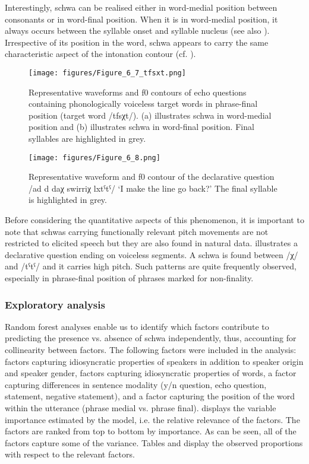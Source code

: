 Interestingly, schwa can be realised either in word-medial position between consonants or in word-final position. When it is in word-medial position, it always occurs between the syllable onset and syllable nucleus (see also \citealt{GordonNafi2012}). Irrespective of its position in the word, schwa appears to carry the same characteristic aspect of the intonation contour (cf. ).
   
  \begin{figure}
   \texttt{[image: figures/Figure\_6\_7\_tfsxt.png]}
  \caption{Representative waveforms and f0 contours of echo questions containing phonologically voiceless target words in phrase-final position (target word /tfsχt/). (a) illustrates schwa in word-medial position and (b) illustrates schwa in word-final position. Final syllables are highlighted in grey.}
   \label{fig:6.7}
   \end{figure}
   
  \begin{figure}
   \texttt{[image: figures/Figure\_6\_8.png]}
  \caption{Representative waveform and f0 contour of the declarative question /ad d daχ swirriχ lxtˁtˁ/ ‘I make the line go back?’ The final syllable is highlighted in grey.}
   \label{fig:6.8}
   \end{figure}
   
\newpage    
Before considering the quantitative aspects of this phenomenon, it is important to note that schwas carrying functionally relevant pitch movements are not restricted to elicited speech but they are also found in natural data.  illustrates a declarative question ending on voiceless segments. A schwa is found between /χ/ and /tˁtˁ/ and it carries high pitch. Such patterns are quite frequently observed, especially in phrase-final position of phrases marked for non-finality.   
   
\subsubsection{Exploratory analysis}
Random forest analyses enable us to identify which factors  contribute to predicting the presence vs. absence of schwa independently, thus, accounting for collinearity between factors. The following factors were included in the analysis: factors capturing idiosyncratic properties of speakers in addition to speaker origin and speaker gender, factors capturing idiosyncratic properties of words, a factor capturing differences in sentence modality (y/n question, echo question, statement, negative statement), and a factor capturing the position of the word within the utterance (phrase medial vs. phrase final).  displays the variable importance estimated by the model, i.e. the relative relevance of the factors. The factors are ranked from top to bottom by importance. As can be seen, all of the factors capture some of the variance. Tables  and  display the observed proportions with respect to the relevant factors.


